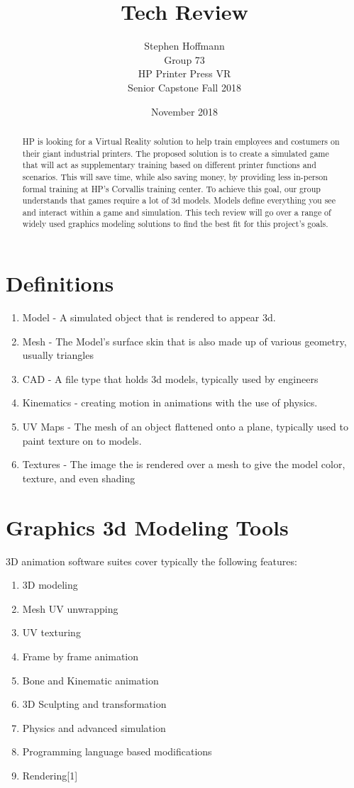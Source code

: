 \documentclass[onecolumn, draftclsnofoot,10pt, compsoc]{IEEEtran}
\title{Tech Review}
\author{
\begin{center}
\item Stephen Hoffmann 
\item Group 73 
\item HP Printer Press VR 
\item Senior Capstone Fall 2018
\end{center}
}
\date{November 2018}
\begin{document}
\maketitle

\begin{abstract}
HP is looking for a Virtual Reality solution to help train employees and costumers on their giant industrial printers. The proposed solution is to create a simulated game that will act as supplementary training based on different printer functions and scenarios. This will save time, while also saving money, by providing less in-person formal training at HP’s Corvallis training center. To achieve this goal, our group understands that games require a lot of 3d models. Models define everything you see and interact within a game and simulation. This tech review will go over a range of widely used graphics modeling solutions to find the best fit for this project’s goals.
\end{abstract}
\newpage
\section{Definitions}
\begin{enumerate}
    \item Model - A simulated object that is rendered to appear 3d.
    \item Mesh - The Model's surface skin that is also made up of various geometry, usually triangles
    \item CAD - A file type that holds 3d models, typically used by engineers
    \item Kinematics - creating motion in animations with the use of physics.
    \item UV Maps - The mesh of an object flattened onto a plane, typically used  to paint texture on to models.
    \item Textures - The image the is rendered over a mesh to give the model color, texture, and even shading
\end{enumerate}

\section{Graphics 3d Modeling Tools}
3D animation software suites cover typically the following features:

\begin{enumerate}
    \item 3D modeling
    \item Mesh UV unwrapping
    \item UV texturing
    \item Frame by frame animation
    \item Bone and Kinematic animation
    \item 3D Sculpting and transformation
    \item Physics and advanced simulation
    \item Programming language based modifications
    \item Rendering[1]
\end{enumerate}
\end{document}
